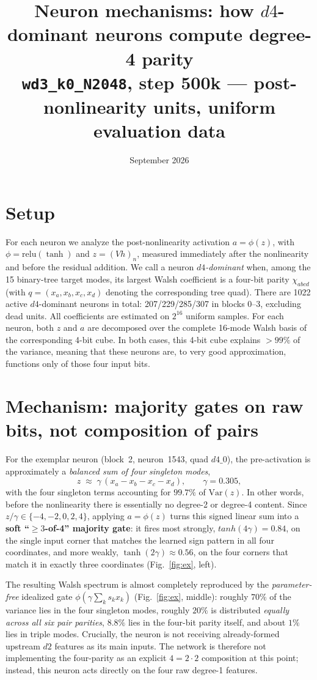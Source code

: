 \documentclass[10pt]{article}
\title{\vspace{-1.2cm}Neuron mechanisms: how $d4$-dominant neurons compute degree-4 parity\\
\large \texttt{wd3\_k0\_N2048}, step 500k --- post-nonlinearity units, uniform evaluation data}
\author{}\date{September 2026}
\begin{document}
\maketitle\vspace{-1.4cm}

\section*{Setup}
For each neuron we analyze the post-nonlinearity activation $a=\phi(z)$, with
$\phi=\mathrm{relu}(\tanh)$ and $z=(Vh)_n$, measured immediately after the
nonlinearity and before the residual addition. We call a neuron \emph{$d4$-dominant}
when, among the 15 binary-tree target modes, its largest Walsh coefficient is a
four-bit parity $\chi_{abcd}$ (with $q=(x_a,x_b,x_c,x_d)$ denoting the corresponding
tree quad). There are 1022 active $d4$-dominant neurons in total: 207/229/285/307 in
blocks 0--3, excluding dead units. All coefficients are estimated on $2^{16}$ uniform
samples. For each neuron, both $z$ and $a$ are decomposed over the complete 16-mode
Walsh basis of the corresponding 4-bit cube. In both cases, this 4-bit cube explains
$>99\%$ of the variance, meaning that these neurons are, to very good approximation,
functions only of those four input bits.

\section*{Mechanism: majority gates on raw bits, not composition of pairs}
For the exemplar neuron (block~2, neuron~1543, quad $d4\_0$), the pre-activation is
approximately a \emph{balanced sum of four singleton modes},
\[
z \;\approx\; \gamma\,( x_a - x_b - x_c - x_d),\qquad \gamma=0.305,
\]
with the four singleton terms accounting for $99.7\%$ of $\mathrm{Var}(z)$. In other
words, before the nonlinearity there is essentially no degree-2 or degree-4 content.
Since $z/\gamma\in\{-4,-2,0,2,4\}$, applying $a=\phi(z)$ turns this signed linear sum
into a \textbf{soft ``$\geq3$-of-4'' majority gate}: it fires most strongly,
$tanh(4\gamma)=0.84$, on the single input corner that matches the learned sign pattern
in all four coordinates, and more weakly, $\tanh(2\gamma)\approx0.56$, on the four
corners that match it in exactly three coordinates (Fig.~\ref{fig:ex}, left).

The resulting Walsh spectrum is almost completely reproduced by the
\emph{parameter-free} idealized gate $\phi(\gamma\sum_k s_k x_k)$
(Fig.~\ref{fig:ex}, middle): roughly $70\%$ of the variance lies in the four
singleton modes, roughly $20\%$ is distributed \emph{equally across all six pair
parities}, $8.8\%$ lies in the four-bit parity itself, and about $1\%$ lies in
triple modes. Crucially, the neuron is not receiving already-formed upstream $d2$
features as its main inputs. The network is therefore not implementing the
four-parity as an explicit $4=2{\cdot}2$ composition at this point; instead, this
neuron acts directly on the four raw degree-1 features.
\end{document}
